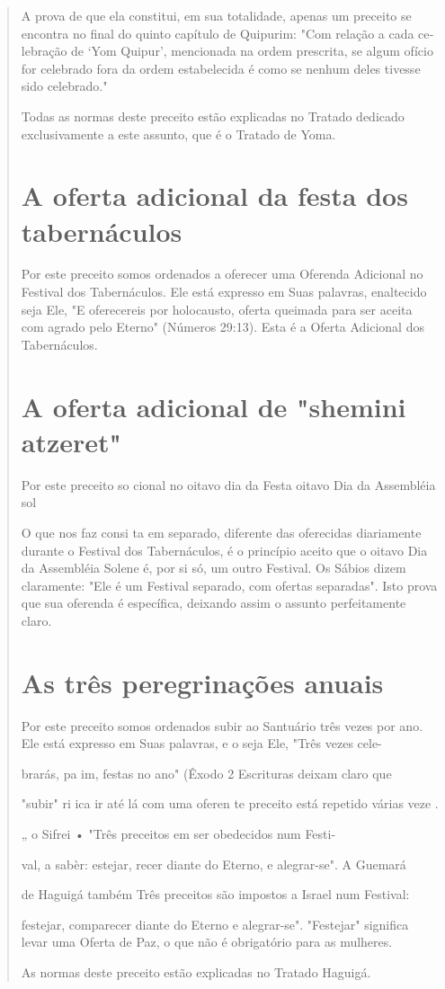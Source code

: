 \begin{quote}
A prova de que ela constitui, em sua totalidade, apenas um preceito se
encontra no final do quinto capítulo de Quipurim: "Com relação a cada
ce­lebração de `Yom Quipur', mencionada na ordem prescrita, se algum
ofício for celebrado fora da ordem estabelecida é como se nenhum deles
tivesse sido ce­lebrado."

Todas as normas deste preceito estão explicadas no Tratado dedica­do
exclusivamente a este assunto, que é o Tratado de Yoma.

\section{A oferta adicional da festa dos tabernáculos}

Por este preceito somos ordenados a oferecer uma Oferenda Adi­cional no
Festival dos Tabernáculos. Ele está expresso em Suas palavras,
enal­tecido seja Ele, "E oferecereis por holocausto, oferta queimada
para ser aceita com agrado pelo Eterno" (Números 29:13). Esta é a Oferta
Adicional dos Ta­bernáculos.

\section{A oferta adicional de "shemini atzeret"}

Por este preceito so cional no oitavo dia da Festa oitavo Dia da
Assembléia sol

O que nos faz consi ta em separado, diferente das oferecidas diariamente
durante o Festival dos Ta­bernáculos, é o princípio aceito que o oitavo
Dia da Assembléia Solene é, por si só, um outro Festival. Os Sábios
dizem claramente: "Ele é um Festival separa­do, com ofertas separadas".
Isto prova que sua oferenda é específica, deixando assim o assunto
perfeitamente claro.

\section{As três peregrinações anuais}

Por este preceito somos ordenados subir ao Santuário três vezes por ano.
Ele está expresso em Suas palavras, e o seja Ele, "Três vezes cele-

brarás, pa im, festas no ano" (Êxodo 2 Escrituras deixam claro que

"subir" ri ica ir até lá com uma oferen te preceito está repetido várias
veze .

„ o Sifrei • "Três preceitos em ser obedecidos num Festi-

val, a sabèr: estejar, recer diante do Eterno, e alegrar-se". A Guemará

de Haguigá também Três preceitos são impostos a Israel num Festival:

festejar, comparecer diante do Eterno e alegrar-se". "Festejar"
significa levar uma Oferta de Paz, o que não é obrigatório para as
mulheres.

As normas deste preceito estão explicadas no Tratado Haguigá.
\end{quote}

